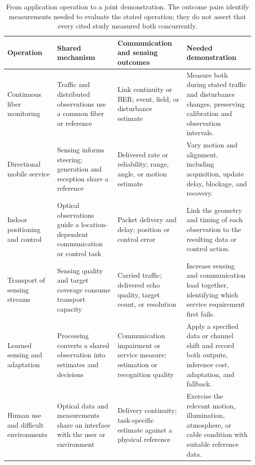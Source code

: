\begin{table}[!t]
\caption{From application operation to a joint demonstration. The outcome
pairs identify measurements needed to evaluate the stated operation; they do
not assert that every cited study measured both concurrently.}
\label{tab:application_requirements}
\centering
\footnotesize
\setlength{\tabcolsep}{3pt}
\renewcommand{\arraystretch}{1.12}
\begin{tabularx}{\textwidth}{@{}
>{\raggedright\arraybackslash}p{}
>{\raggedright\arraybackslash}p{}
>{\raggedright\arraybackslash}p{}
>{\raggedright\arraybackslash}X@{}}
\toprule
Operation & Shared mechanism & Communication and sensing outcomes & Needed demonstration \\
\midrule
Continuous fiber monitoring & Traffic and distributed observations use a common
fiber or reference \cite{OISAC_SCR00346,OISAC_SCR00957} & Link continuity or BER;
event, field, or disturbance estimate & Measure both during stated traffic and
disturbance changes, preserving calibration and observation intervals. \\
\addlinespace[2pt]
Directional mobile service & Sensing informs steering; generation and reception
share a reference \cite{OISAC_SCR00502,OISAC_SCR00406} & Delivered rate or
reliability; range, angle, or motion estimate & Vary motion and alignment,
including acquisition, update delay, blockage, and recovery. \\
\addlinespace[2pt]
Indoor positioning and control & Optical observations guide a location-dependent
communication or control task \cite{OISAC_SCR01024,OISAC_SCR00910} & Packet delivery
and delay; position or control error & Link the geometry and timing of each
observation to the resulting data or control action. \\
\addlinespace[2pt]
Transport of sensing streams & Sensing quality and target coverage consume
transport capacity \cite{OISAC_SCR00436,OISAC_SCR01049} & Carried traffic; delivered
echo quality, target count, or resolution & Increase sensing and communication
load together, identifying which service requirement first fails. \\
\addlinespace[2pt]
Learned sensing and adaptation & Processing converts a shared observation into
estimates and decisions \cite{OISAC_SCR00949,OISAC_SCR01047} & Communication
impairment or service measure; estimation or recognition quality & Apply a
specified data or channel shift and record both outputs, inference cost,
adaptation, and fallback. \\
\addlinespace[2pt]
Human use and difficult environments & Optical data and measurements share an
interface with the user or environment
\cite{OISAC_SCR00376,OISAC_SCR00456,OISAC_SCR01095} & Delivery continuity; task-specific
estimate against a physical reference & Exercise the relevant motion,
illumination, atmosphere, or cable condition with suitable reference data. \\
\bottomrule
\end{tabularx}
\end{table}

